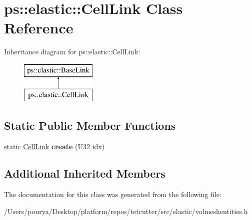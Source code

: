 \hypertarget{classps_1_1elastic_1_1CellLink}{}\section{ps\+:\+:elastic\+:\+:Cell\+Link Class Reference}
\label{classps_1_1elastic_1_1CellLink}
Inheritance diagram for ps\+:\+:elastic\+:\+:Cell\+Link\+:\begin{figure}[H]
\begin{center}
\leavevmode
\includegraphics[height=2.000000cm]{classps_1_1elastic_1_1CellLink}
\end{center}
\end{figure}
\subsection*{Static Public Member Functions}
\begin{DoxyCompactItemize}
\item 
\hypertarget{classps_1_1elastic_1_1CellLink_a00f56f6c8708a51ad8d9588d7c6f2a7a}{}static \hyperlink{classps_1_1elastic_1_1CellLink}{Cell\+Link} {\bfseries create} (U32 idx)\label{classps_1_1elastic_1_1CellLink_a00f56f6c8708a51ad8d9588d7c6f2a7a}

\end{DoxyCompactItemize}
\subsection*{Additional Inherited Members}


The documentation for this class was generated from the following file\+:\begin{DoxyCompactItemize}
\item 
/\+Users/pourya/\+Desktop/platform/repos/tetcutter/src/elastic/volmeshentities.\+h\end{DoxyCompactItemize}
